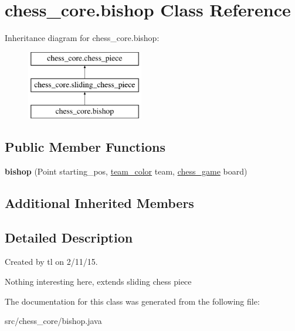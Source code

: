 \hypertarget{classchess__core_1_1bishop}{}\section{chess\+\_\+core.\+bishop Class Reference}
\label{classchess__core_1_1bishop}
Inheritance diagram for chess\+\_\+core.\+bishop\+:\begin{figure}[H]
\begin{center}
\leavevmode
\includegraphics[height=3.000000cm]{classchess__core_1_1bishop}
\end{center}
\end{figure}
\subsection*{Public Member Functions}
\begin{DoxyCompactItemize}
\item 
\hypertarget{classchess__core_1_1bishop_a554ab5f785b4a94d3072cd6f4e598f1d}{}{\bfseries bishop} (Point starting\+\_\+pos, \hyperlink{enumchess__core_1_1team__color}{team\+\_\+color} team, \hyperlink{classchess__core_1_1chess__game}{chess\+\_\+game} board)\label{classchess__core_1_1bishop_a554ab5f785b4a94d3072cd6f4e598f1d}

\end{DoxyCompactItemize}
\subsection*{Additional Inherited Members}


\subsection{Detailed Description}
Created by tl on 2/11/15.

Nothing interesting here, extends sliding chess piece 

The documentation for this class was generated from the following file\+:\begin{DoxyCompactItemize}
\item 
src/chess\+\_\+core/bishop.\+java\end{DoxyCompactItemize}
